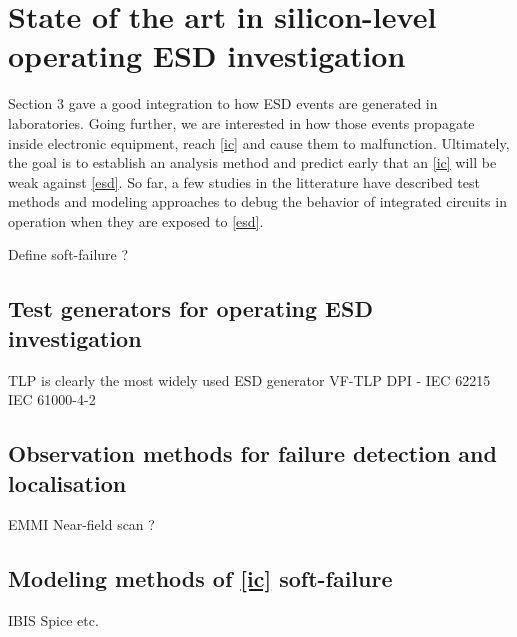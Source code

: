 \section{State of the art in silicon-level operating ESD investigation}

Section 3 gave a good integration to how ESD events are generated in laboratories.
Going further, we are interested in how those events propagate inside electronic equipment, reach \ref{ic} and cause them to malfunction.
Ultimately, the goal is to establish an analysis method and predict early that an \ref{ic} will be weak against \ref{esd}.
So far, a few studies in the litterature have described test methods and modeling approaches to debug the behavior of
integrated circuits in operation when they are exposed to \ref{esd}.

Define soft-failure ?

\subsection{Test generators for operating ESD investigation}

TLP is clearly the most widely used ESD generator
VF-TLP
DPI - IEC 62215
IEC 61000-4-2

\subsection{Observation methods for failure detection and localisation}

EMMI
Near-field scan ?

\subsection{Modeling methods of \ref{ic} soft-failure}

IBIS
Spice
etc.
